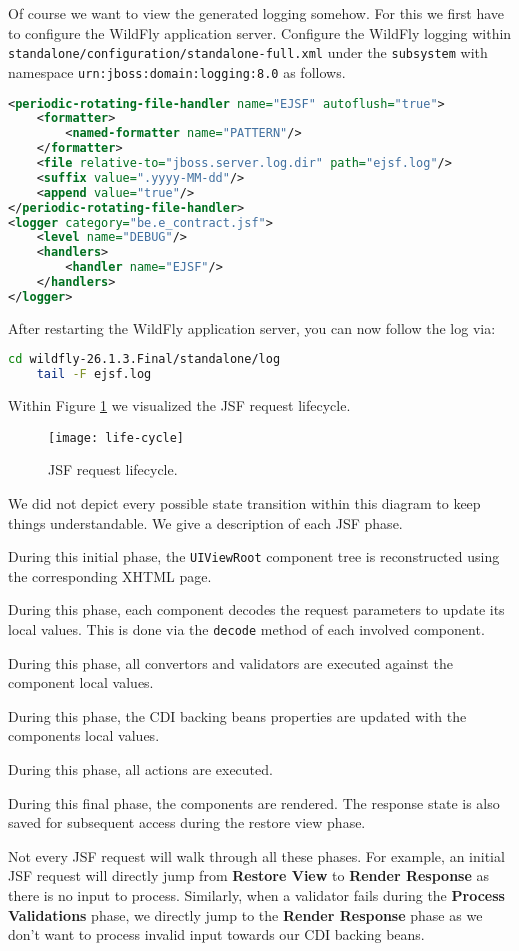 Of course we want to view the generated logging somehow.
For this we first have to configure the WildFly application server.
Configure the WildFly logging within \texttt{standalone/configuration/standalone-full.xml} under the \texttt{subsystem} with namespace \texttt{urn:jboss:domain:logging:8.0} as follows.
\begin{lstlisting}[language=XML]
<periodic-rotating-file-handler name="EJSF" autoflush="true">
	<formatter>
		<named-formatter name="PATTERN"/>
	</formatter>
	<file relative-to="jboss.server.log.dir" path="ejsf.log"/>
	<suffix value=".yyyy-MM-dd"/>
	<append value="true"/>
</periodic-rotating-file-handler>
<logger category="be.e_contract.jsf">
	<level name="DEBUG"/>
	<handlers>
		<handler name="EJSF"/>
	</handlers>
</logger>
\end{lstlisting}
After restarting the WildFly application server, you can now follow the log via:
\begin{lstlisting}[language=bash]
	cd wildfly-26.1.3.Final/standalone/log
	tail -F ejsf.log
\end{lstlisting}
Within Figure \ref{fig:life-cycle} we visualized the JSF request lifecycle.
\begin{figure}[htbp]
	\begin{center}
		\texttt{[image: life-cycle]}
		\caption{JSF request lifecycle.}
		\label{fig:life-cycle}
	\end{center}
\end{figure}
We did not depict every possible state transition within this diagram to keep things understandable.
We give a description of each JSF phase.
\begin{description}[style=nextline]
	\item[Restore View]
	During this initial phase, the \texttt{UIViewRoot} component tree is reconstructed using the corresponding XHTML page.
	\item[Apply Request Values]
	During this phase, each component decodes the request parameters to update its local values.
	This is done via the \texttt{decode} method of each involved component.
	\item[Process Validations]
	During this phase, all convertors and validators are executed against the component local values.
	\item[Update Model Values]
	During this phase, the CDI backing beans properties are updated with the components local values.
	\item[Invoke Application]
	During this phase, all actions are executed.
	\item[Render Response]
	During this final phase, the components are rendered.
	The response state is also saved for subsequent access during the restore view phase.
\end{description}
Not every JSF request will walk through all these phases. For example, an initial JSF request will directly jump from \textbf{Restore View} to \textbf{Render Response} as there is no input to process.
Similarly, when a validator fails during the \textbf{Process Validations} phase, we directly jump to the \textbf{Render Response} phase as we don't want to process invalid input towards our CDI backing beans.

